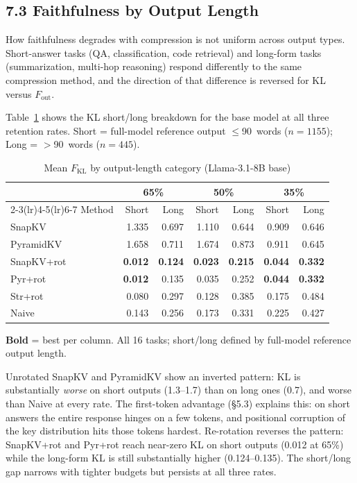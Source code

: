 \documentclass[10pt,letterpaper]{article}
\begin{document}
\subsection{7.3 Faithfulness by Output Length}\label{faithfulness-by-output-length}

How faithfulness degrades with compression is not uniform across output types.
Short-answer tasks (QA, classification, code retrieval) and long-form tasks
(summarization, multi-hop reasoning) respond differently to the same compression method,
and the direction of that difference is reversed for KL versus \(F_{\text{out}}\).

Table~\ref{tab:base-kl-shortlong} shows the KL short/long breakdown for the base
model at all three retention rates.
Short = full-model reference output $\leq$90~words ($n=1155$);
Long = $>$90~words ($n=445$).

\begin{table}[H]
\centering
\small
\captionsetup{justification=centering}
\caption{Mean \(F_{\text{KL}}\) by output-length category (Llama-3.1-8B base)}
\label{tab:base-kl-shortlong}
\begin{tabular}{@{}lrrrrrr@{}}
\toprule
& \multicolumn{2}{c}{65\%} & \multicolumn{2}{c}{50\%} & \multicolumn{2}{c}{35\%}\\
\cmidrule(lr){2-3}\cmidrule(lr){4-5}\cmidrule(lr){6-7}
Method & Short & Long & Short & Long & Short & Long\\
\midrule
SnapKV     & 1.335 & 0.697 & 1.110 & 0.644 & 0.909 & 0.646\\
PyramidKV  & 1.658 & 0.711 & 1.674 & 0.873 & 0.911 & 0.645\\
\midrule
SnapKV+rot & \textbf{0.012} & \textbf{0.124} & \textbf{0.023} & \textbf{0.215} & \textbf{0.044} & \textbf{0.332}\\
Pyr+rot    & \textbf{0.012} & 0.135 & 0.035 & 0.252 & \textbf{0.044} & \textbf{0.332}\\
Str+rot    & 0.080 & 0.297 & 0.128 & 0.385 & 0.175 & 0.484\\
Naive      & 0.143 & 0.256 & 0.173 & 0.331 & 0.225 & 0.427\\
\bottomrule
\end{tabular}
\center\smallskip
\textbf{Bold} = best per column.
All 16 tasks; short/long defined by full-model reference output length.
\end{table}

Unrotated SnapKV and PyramidKV show an inverted pattern: KL is substantially
\emph{worse} on short outputs (1.3--1.7) than on long ones (0.7), and worse
than Naive at every rate. The first-token advantage (\S5.3) explains this:
on short answers the entire response hinges on a few tokens, and positional
corruption of the key distribution hits those tokens hardest.
Re-rotation reverses the pattern: SnapKV+rot and Pyr+rot reach near-zero
KL on short outputs (0.012 at 65\%) while the long-form KL is still
substantially higher (0.124--0.135). The short/long gap narrows with tighter
budgets but persists at all three rates.
\end{document}
